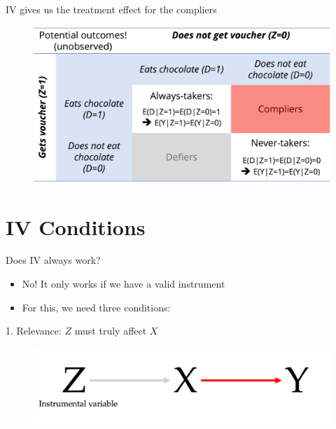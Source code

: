 \documentclass[11pt,xcolor=table]{beamer}
\begin{document}
\begin{frame}{IV gives us the treatment effect for the compliers}

\begin{figure}
\includegraphics[width=\textwidth]{figures/iv_table.png}
\end{figure}

\end{frame}


\section{IV Conditions}

\begin{frame}{Does IV always work?}

\begin{itemize}
    \item No! It only works if we have a valid instrument
    \item For this, we need three conditions:
\end{itemize}

1. Relevance: $Z$ must truly affect $X$
\begin{figure}
\includegraphics[width=\textwidth]{DAGs/iv_relevance.png}
\end{figure}

\end{frame}
\end{document}
